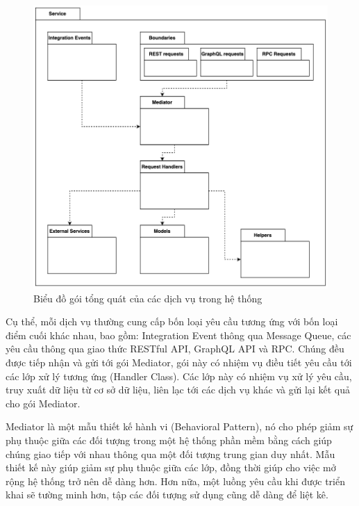 \documentclass[../DoAn.tex]{subfiles}
\begin{document}
\begin{figure}[H]
    \centering
    \includegraphics[width=1.0\linewidth]{Hinhve/Package_GeneralServicePackageDiagram.png}
    \caption{Biểu đồ gói tổng quát của các dịch vụ trong hệ thống}
    \label{fig:Package_GeneralServicePackageDiagram}
\end{figure}

Cụ thể, mỗi dịch vụ thường cung cấp bốn loại yêu cầu tương ứng với bốn loại điểm cuối khác nhau, bao gồm: Integration Event thông qua Message Queue,
các yêu cầu thông qua giao thức RESTful API, GraphQL API và RPC. Chúng đều được tiếp nhận và gửi tới gói Mediator, gói này có nhiệm vụ điều tiết yêu cầu
tới các lớp xử lý tương ứng (Handler Class). Các lớp này có nhiệm vụ xử lý yêu cầu, truy xuất dữ liệu từ cơ sở dữ liệu, liên lạc tới các dịch vụ khác và gửi lại kết quả cho gói Mediator.

\newpage

Mediator là một mẫu thiết kế hành vi (Behavioral Pattern), nó cho phép giảm sự phụ thuộc giữa các đối tượng trong một hệ thống phần mềm bằng cách
giúp chúng giao tiếp với nhau thông qua một đối tượng trung gian duy nhất. Mẫu thiết kế này giúp giảm sự phụ thuộc giữa các lớp, đồng thời giúp cho việc
mở rộng hệ thống trở nên dễ dàng hơn. Hơn nữa, một luồng yêu cầu khi được triển khai sẽ tường minh hơn, tập các đối tượng sử dụng cũng dễ dàng để liệt kê.\cite{DesignPatterns}
\end{document}
